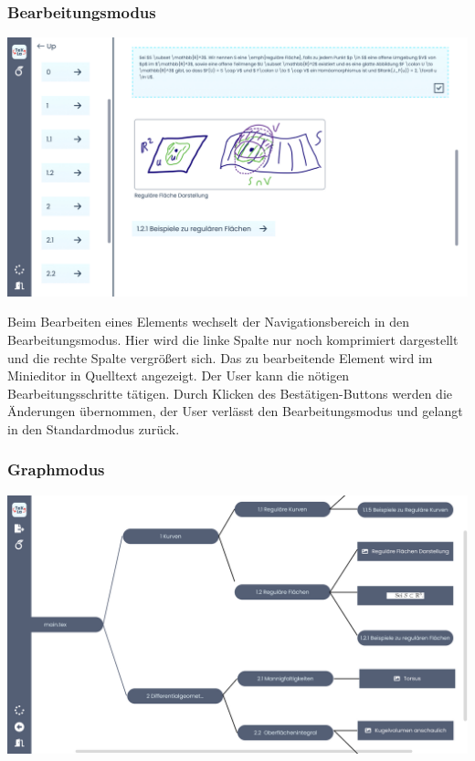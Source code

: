 \subsubsection{Bearbeitungsmodus}

\begin{minipage}{\linewidth}
  \includegraphics[width=\textwidth]{assets/img/Editor_View}
\end{minipage}

Beim Bearbeiten eines Elements wechselt der Navigationsbereich in den Bearbeitungsmodus.
Hier wird die linke Spalte nur noch komprimiert dargestellt und die rechte Spalte vergrößert sich.
Das zu bearbeitende Element wird im Minieditor in Quelltext angezeigt.
Der User kann die nötigen Bearbeitungsschritte tätigen.
Durch Klicken des Bestätigen-Buttons werden die Änderungen übernommen, der User verlässt den Bearbeitungsmodus und
gelangt in den Standardmodus zurück.

\subsubsection{Graphmodus}

\begin{minipage}{\linewidth}
  \includegraphics[width=\textwidth]{assets/img/Graphansicht}
\end{minipage}

